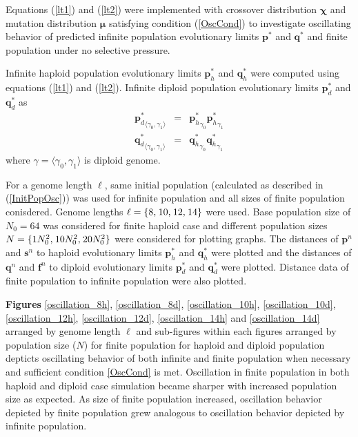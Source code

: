 Equations (\ref{lt1}) and (\ref{lt2}) were implemented with crossover distribution $\bm{\chi}$ and mutation distribution $\bm{\mu}$ satisfying 
condition (\ref{OscCond}) to investigate oscillating behavior of predicted infinite population evolutionary limits $\bm{p}^{\ast}$ and $\bm{q}^{\ast}$ 
and finite population under no selective pressure.

Infinite haploid population evolutionary limits $\bm{p}_h^{\ast}$ and $\bm{q}_h^{\ast}$ were computed using equations (\ref{lt1}) and (\ref{lt2}). 
Infinite diploid population evolutionary limits $\bm{p}_d^{\ast}$ and $\bm{q}_d^{\ast}$ as
\begin{eqnarray*}
{\bm{p}_d^{\ast}}_{\langle \gamma_0, \gamma_1 \rangle} & = & {\bm{p}_h^{\ast}}_{\gamma_0} {\bm{p}_h^{\ast}}_{\gamma_1} \\
{\bm{q}_d^{\ast}}_{\langle \gamma_0, \gamma_1 \rangle} & = & {\bm{q}_h^{\ast}}_{\gamma_0} {\bm{q}_h^{\ast}}_{\gamma_1}
\end{eqnarray*}
where $\gamma = \langle \gamma_0, \gamma_1 \rangle$ is diploid genome.

For a genome length $\ell$, same initial population (calculated as described in (\ref{InitPopOsc})) was used for infinite population and all 
sizes of finite population conisdered.
Genome lengths $\ell = \{8, \hspace{0.01in}10, \hspace{0.01in}12, \hspace{0.01in}14\}$ were used. Base population size of $N_0 = 64$ was considered for finite haploid case and 
different population sizes $N = \{1N_0^2, \hspace{0.01in}10N_0^2, \hspace{0.01in}20N_0^2\}$ were considered for plotting graphs. 
The distances of $\bm{p}^n$ and $\bm{s}^n$ to haploid evolutionary limits $\bm{p}_h^{\ast}$ and $\bm{q}_h^{\ast}$ were plotted and the distances of $\bm{q}^n$ and 
$\bm{f}^n$ to diploid evolutionary limits $\bm{p}_d^{\ast}$ and $\bm{q}_d^{\ast}$ were plotted. Distance data of finite population to infinite population were also plotted.





\textbf{ Figures} \ref{oscillation_8h}, \ref{oscillation_8d}, \ref{oscillation_10h}, \ref{oscillation_10d}, \ref{oscillation_12h}, \ref{oscillation_12d}, 
\ref{oscillation_14h} and \ref{oscillation_14d} arranged by genome length $\ell$ 
and sub-figures within each figures arranged by population size ($N$) for finite population for haploid and diploid population 
depticts oscillating behavior of both infinite and finite population when necessary and sufficient condition \ref{OscCond} is met. 
Oscillation in finite population in both haploid and diploid case simulation became sharper with increased population size as expected. 
As size of finite population increased, oscillation behavior depicted by finite population grew analogous to oscillation behavior 
depicted by infinite population. 

